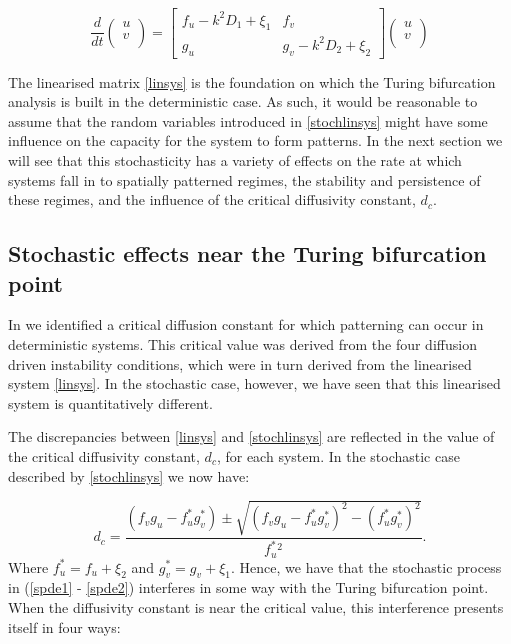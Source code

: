\documentclass[12pt]{article}
\begin{document}
\begin{equation}\label{stochlinsys}
    \frac{d}{dt} 
    \left(
    \begin{array}{c}
    u\\
    v\\
    \end{array}
    \right)
    = 
    \left[
    \begin{array}{cc}
      f_u - k^2D_1 + \xi_1   & f_v \\
      g_u   &  g_v - k^2D_2 + \xi_2
    \end{array}
    \right]
    \left(
    \begin{array}{c}
    u\\
    v\\
    \end{array}
    \right)
\end{equation}

The linearised matrix \eqref{linsys} is the foundation on which the Turing bifurcation analysis is built in the deterministic case. As such, it would be reasonable to assume that the random variables introduced in \eqref{stochlinsys} might have some influence on the capacity for the system to form patterns. In the next section we will see that this stochasticity has a variety of effects on the rate at which systems fall in to spatially patterned regimes, the stability and persistence of these regimes, and the influence of the critical diffusivity constant, $d_c$.

\subsection{Stochastic effects near the Turing bifurcation point}

In  we identified a critical diffusion constant for which patterning can occur in deterministic systems. This critical value was derived from the four diffusion driven instability conditions, which were in turn derived from the linearised system \eqref{linsys}. In the stochastic case, however, we have seen that this linearised system is quantitatively different.

The discrepancies between \eqref{linsys} and \eqref{stochlinsys} are reflected in the value of the critical diffusivity constant, $d_c$, for each system. In the stochastic case described by \eqref{stochlinsys} we now have:

\begin{equation}\label{stochdc}
 d_c = \frac{(f_vg_u - f_u^*g_v^*) \pm \sqrt{(f_vg_u-f_u^*g_v^*)^2 - (f_u^*g_v^*)^2 }}{f_u^*^2}.
\end{equation}
Where $f_u^* = f_u + \xi_2$ and $g_v^* = g_v + \xi_1$. Hence, we have that the stochastic process in (\ref{spde1} - \ref{spde2}) interferes in some way with the Turing bifurcation point. When the diffusivity constant is near the critical value, this interference presents itself in four ways:
\end{document}
